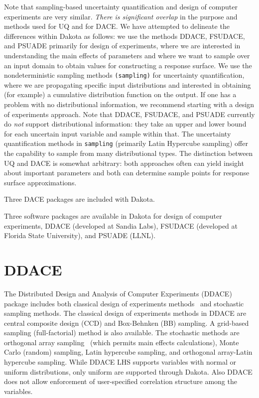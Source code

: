 Note that sampling-based uncertainty quantification and design of
computer experiments are very similar.  \emph{There is significant
overlap} in the purpose and methods used for UQ and for DACE.  We have
attempted to delineate the differences within Dakota as follows: we
use the methods DDACE, FSUDACE, and PSUADE primarily for design of
experiments, where we are interested in understanding the main effects
of parameters and where we want to sample over an input domain to
obtain values for constructing a response surface.  We use the
nondeterministic sampling methods \texttt{(sampling)} for
uncertainty quantification, where we are propagating specific input
distributions and interested in obtaining (for example) a cumulative
distribution function on the output.  If one has a problem with no
distributional information, we recommend starting with a design of
experiments approach.  Note that DDACE, FSUDACE, and PSUADE currently
do \emph{not} support distributional information: they take an upper
and lower bound for each uncertain input variable and sample within
that.  The uncertainty quantification methods in
\texttt{sampling} (primarily Latin Hypercube sampling) offer the
capability to sample from many distributional types.  The distinction
between UQ and DACE is somewhat arbitrary: both approaches often can
yield insight about important parameters and both can determine sample
points for response surface approximations.

Three DACE packages are included with Dakota.

Three software packages are available in Dakota for design of computer
experiments, DDACE (developed at Sandia Labs), FSUDACE (developed at
Florida State University), and PSUADE (LLNL).

\section{DDACE}\label{dace:ddace}

The Distributed Design and Analysis of Computer Experiments (DDACE)
package includes both classical design of experiments
methods~\cite{TonXX} and stochastic sampling methods. The classical
design of experiments methods in DDACE are central composite design
(CCD) and Box-Behnken (BB) sampling. A grid-based sampling
(full-factorial) method is also available. The stochastic methods are
orthogonal array sampling~\cite{Koe96} (which permits main effects
calculations), Monte Carlo (random) sampling, Latin hypercube
sampling, and orthogonal array-Latin hypercube sampling.  While DDACE
LHS supports variables with normal or uniform distributions, only
uniform are supported through Dakota.  Also DDACE does not allow
enforcement of user-specified correlation structure among the
variables.

